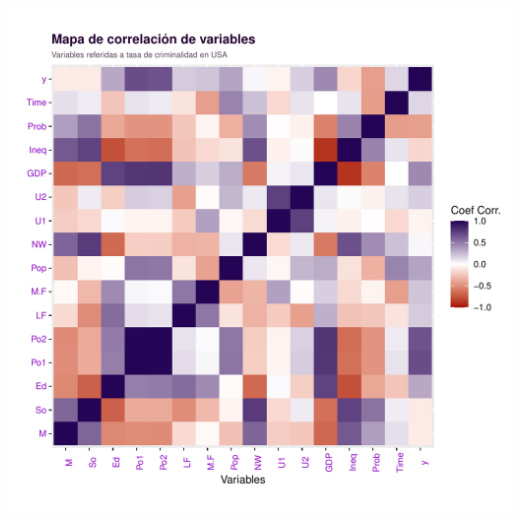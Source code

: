 \documentclass[11pt,a4paper]{article}\usepackage[]{graphicx}\usepackage[]{color}
\makeatletter
\def\maxwidth{ %
  \ifdim\Gin@nat@width>\linewidth
    \linewidth
  \else
    \Gin@nat@width
  \fi
}
\newenvironment{knitrout}{}{} %
\makeatother
\begin{document}
\begin{knitrout}
\color{fgcolor}
\includegraphics[width=\maxwidth]{figure/unnamed-chunk-2-1} 

\end{knitrout}
\end{document}
